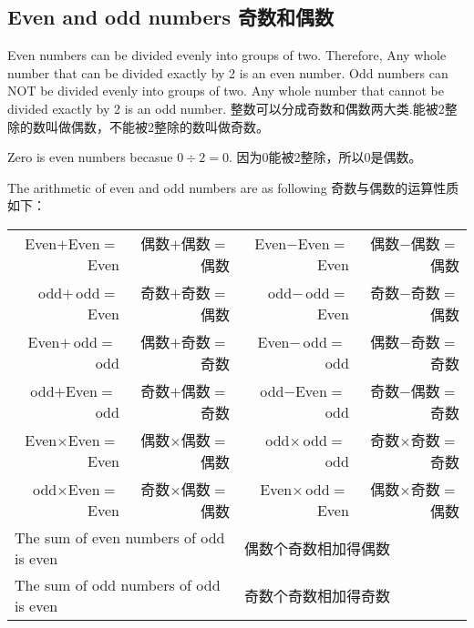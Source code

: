\subsection{Even and odd numbers 奇数和偶数}
\begin{paracol}{2}
Even numbers can be divided evenly into groups of two. Therefore, Any whole number that can be divided exactly by 2 is an even number. Odd numbers can NOT be divided evenly into groups of two. Any whole number that cannot be divided exactly by 2 is an odd number.
\switchcolumn
整数可以分成奇数和偶数两大类.能被2整除的数叫做偶数，不能被2整除的数叫做奇数。
\end{paracol}

\begin{note}
Zero is even numbers becasue $0\div 2 = 0$. 因为0能被2整除，所以0是偶数。
\end{note}

\begin{paracol}{2}
The arithmetic of even and odd numbers are as following 
\switchcolumn
奇数与偶数的运算性质如下：
\end{paracol}

\begin{table}[!hbtp]
\begin{center}
\begin{tabular}{rrrr}
Even$+$Even$=$Even &偶数$+$偶数$=$偶数 & Even$-$Even$=$Even & 偶数$-$偶数$=$偶数 \\ 
odd$+$\,\:odd$=$Even &奇数$+$奇数$=$偶数 & odd$-$\,\:odd$=$Even & 奇数$-$奇数$=$偶数 \\ 
Even$+$\,\:odd$=$\,\:odd &偶数$+$奇数$=$奇数 & Even$-$\,\:odd$=$\,\:odd & 偶数$-$奇数$=$奇数 \\ 
odd$+$Even$=$\,\:odd &奇数$+$偶数$=$奇数 & odd$-$Even$=$\,\:odd & 奇数$-$偶数$=$奇数 \\ 
Even$\times$Even$=$Even &偶数$\times$偶数$=$偶数 & odd$\times$\,\:odd$=$\,\:odd &奇数$\times$奇数$=$奇数 \\ 
odd$\times$Even$=$Even &奇数$\times$偶数$=$偶数 & Even$\times$\,\:odd$=$Even & 偶数$\times$奇数$=$偶数 \\ 
\multicolumn{2}{l}{The sum of even numbers of odd is even} & \multicolumn{2}{l}{偶数个奇数相加得偶数}\\
\multicolumn{2}{l}{The sum of odd numbers of odd is even} & \multicolumn{2}{l}{奇数个奇数相加得奇数}\\
\end{tabular}
\end{center}
\end{table}

